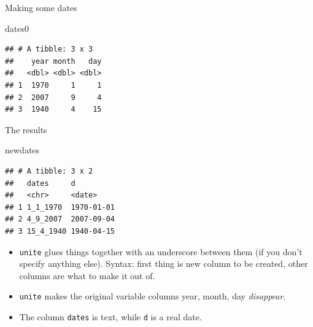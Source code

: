 \documentclass[ignorenonframetext,]{beamer}
\newenvironment{Shaded}{\begin{snugshade}}{\end{snugshade}}
\newcommand{\DataTypeTok}[1]{\textcolor[rgb]{0.13,0.29,0.53}{#1}}
\newcommand{\KeywordTok}[1]{\textcolor[rgb]{0.13,0.29,0.53}{\textbf{#1}}}
\newcommand{\NormalTok}[1]{#1}
\newcommand{\OperatorTok}[1]{\textcolor[rgb]{0.81,0.36,0.00}{\textbf{#1}}}
\newcommand{\StringTok}[1]{\textcolor[rgb]{0.31,0.60,0.02}{#1}}
\providecommand{\tightlist}{%
  \setlength{\itemsep}{0pt}\setlength{\parskip}{0pt}}
\begin{document}
\begin{frame}[fragile]{Making some dates}
\protect\hypertarget{making-some-dates}{}

\begin{Shaded}
\begin{Highlighting}[]
\NormalTok{dates0}
\end{Highlighting}
\end{Shaded}

\begin{verbatim}
## # A tibble: 3 x 3
##    year month   day
##   <dbl> <dbl> <dbl>
## 1  1970     1     1
## 2  2007     9     4
## 3  1940     4    15
\end{verbatim}

\begin{Shaded}
\end{Shaded}

\end{frame}

\begin{frame}[fragile]{The results}
\protect\hypertarget{the-results}{}

\begin{Shaded}
\begin{Highlighting}[]
\NormalTok{newdates}
\end{Highlighting}
\end{Shaded}

\begin{verbatim}
## # A tibble: 3 x 2
##   dates     d         
##   <chr>     <date>    
## 1 1_1_1970  1970-01-01
## 2 4_9_2007  2007-09-04
## 3 15_4_1940 1940-04-15
\end{verbatim}

\begin{itemize}
\tightlist
\item
  \texttt{unite} glues things together with an underscore between them
  (if you don't specify anything else). Syntax: first thing is new
  column to be created, other columns are what to make it out of.
\item
  \texttt{unite} makes the original variable columns year, month, day
  \emph{disappear}.
\item
  The column \texttt{dates} is text, while \texttt{d} is a real date.
\end{itemize}

\end{frame}
\end{document}
